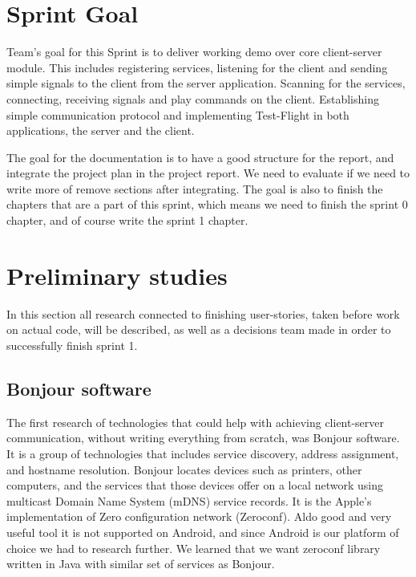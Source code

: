 
\section{Sprint Goal}

Team's goal for this Sprint is to deliver working demo over core client-server module.
This includes registering services, listening for the client and sending simple signals to the client from the server application.
Scanning for the services, connecting, receiving signals and play commands on the client.
Establishing simple communication protocol and implementing Test-Flight in both applications, the server and the client.

The goal for the documentation is to have a good structure for the report, and integrate the project plan in the project report. We need to evaluate if we need to write more of remove sections after integrating. The goal is also to finish the chapters that are a part of this sprint, which means we need to finish the sprint 0 chapter, and of course write the sprint 1 chapter.

\section {Preliminary studies}
In this section all research connected to finishing user-stories, taken before work on actual code, will be described, as well as a decisions team made in order to successfully finish sprint 1.

\subsection{Bonjour software}
The first research of technologies that could help with achieving client-server communication, without writing everything from scratch, was Bonjour software. 
It is a group of technologies that includes service discovery, address assignment, and hostname resolution. 
Bonjour locates devices such as printers, other computers, and the services that those devices offer on a local network using multicast Domain Name System (mDNS) service records.
It is the Apple's implementation of Zero configuration network (Zeroconf).
Aldo good and very useful tool it is not supported on Android, and since Android is our platform of choice we had to research further. 
We learned that we want zeroconf library written in Java with similar set of services as Bonjour.

